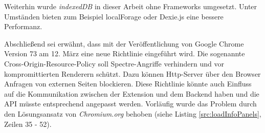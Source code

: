 Weiterhin wurde \textit{indexedDB} in dieser Arbeit ohne Frameworks umgesetzt. Unter Umständen bieten zum Beispiel \glqq localForage \grqq{}\cite{forage} oder \glqq Dexie.js \grqq{}\cite{dexie} eine bessere Performanz.

Abschließend sei erwähnt, dass mit der Veröffentlichung von Google Chrome Version 73 am 12. März eine neue Richtlinie eingeführt wird. Die sogenannte \glqq Cross-Origin-Resource-Policy \grqq{}\cite{corb} soll \glqq Spectre\grqq{}-Angriffe\cite{spectre} verhindern und vor kompromittierten Renderern schützt. Dazu können Http-Server über den Browser Anfragen von externen Seiten blockieren. Diese Richtlinie könnte auch Einfluss auf die Kommunikation zwischen der Extension und dem Backend haben und die API müsste entsprechend angepasst werden. Vorläufig wurde das Problem durch den Lösungsansatz von \textit{Chromium.org}\cite{corb2} behoben (siehe Listing \ref{src:loadInfoPanels}, Zeilen 35 - 52).













